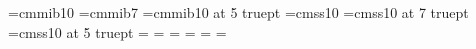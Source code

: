  \usepackage[percent]{overpic}




\makeatletter
\def\@part[#1]#2{%
    \ifnum \c@secnumdepth >-2\relax
      \refstepcounter{part}%
      \addcontentsline{toc}{part}{\partname~\thepart\hspace{1em}#1}%
    \else
      \addcontentsline{toc}{part}{#1}%
    \fi
    \markboth{}{}%
    {\centering
     \interlinepenalty \@M
     \normalfont
     \ifnum \c@secnumdepth >-2\relax
       \huge\bfseries \partname\nobreakspace\thepart
       \par
       \vskip 20\p@
     \fi
     \Huge \bfseries #2\par}%
    \@endpart}
\makeatother



    
\renewcommand\footnoterule{\textcolor{unibo}{\kern-3pt \hrule width 2in \kern 2.6pt}}


\renewcommand\thefootnote{\textcolor{unibo}{\arabic{footnote}}}

\usepackage{tocloft}
\renewcommand{\cftdot}{\textcolor{unibo}{.}}
\renewcommand{\cftchapaftersnum}{~\textcolor{unibo}{|}~}


\font\grassettogreco=cmmib10
\font\scriptgrassettogreco=cmmib7
\font\scriptscriptgrassettogreco=cmmib10 at 5 truept
\font\sansserif=cmss10
\font\scriptsansserif=cmss10 at 7 truept
\font\scriptscriptsansserif=cmss10 at 5 truept
=\grassettogreco
{}=\scriptgrassettogreco
{}=\scriptscriptgrassettogreco
\def\bgr{\fam=13}
=\sansserif
{}=\scriptsansserif
{}=\scriptscriptsansserif
\def\ssm{\fam=14}

